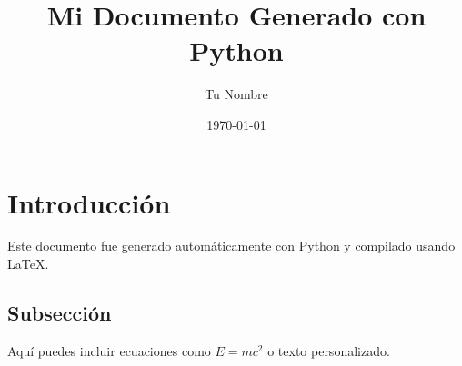 \documentclass{article}
\title{Mi Documento Generado con Python}
\author{Tu Nombre}
\date{\today}
\begin{document}
    \maketitle

    \section{Introducci\'on}
    Este documento fue generado autom\'aticamente con Python y compilado usando LaTeX.

    \subsection{Subsecci\'on}
    Aqu\'i puedes incluir ecuaciones como $E=mc^2$ o texto personalizado.

    
\end{document}

